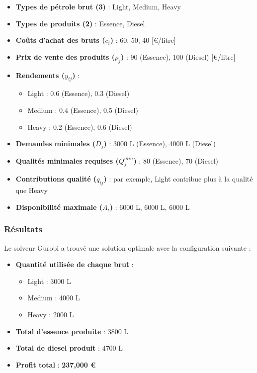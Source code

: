 \documentclass[a4paper,11pt]{article}
\begin{document}
\begin{itemize}
    \item \textbf{Types de pétrole brut (3)} : Light, Medium, Heavy
    \item \textbf{Types de produits (2)} : Essence, Diesel
    \item \textbf{Coûts d'achat des bruts ($c_i$)} : 60, 50, 40 [\euro /litre]
    \item \textbf{Prix de vente des produits ($p_j$)} : 90 (Essence), 100 (Diesel) [\euro /litre]
    \item \textbf{Rendements ($y_{ij}$)} :
    \begin{itemize}
        \item Light : 0.6 (Essence), 0.3 (Diesel)
        \item Medium : 0.4 (Essence), 0.5 (Diesel)
        \item Heavy : 0.2 (Essence), 0.6 (Diesel)
    \end{itemize}
    \item \textbf{Demandes minimales ($D_j$)} : 3000 L (Essence), 4000 L (Diesel)
    \item \textbf{Qualités minimales requises ($Q_j^{min}$)} : 80 (Essence), 70 (Diesel)
    \item \textbf{Contributions qualité ($q_{ij}$)} : par exemple, Light contribue plus à la qualité que Heavy
    \item \textbf{Disponibilité maximale ($A_i$)} : 6000 L, 6000 L, 6000 L
\end{itemize}

\subsubsection*{Résultats}

Le solveur Gurobi a trouvé une solution optimale avec la configuration suivante :

\begin{itemize}
    \item \textbf{Quantité utilisée de chaque brut} :
    \begin{itemize}
        \item Light : 3000 L
        \item Medium : 4000 L
        \item Heavy : 2000 L
    \end{itemize}
    \item \textbf{Total d’essence produite} : 3800 L
    \item \textbf{Total de diesel produit} : 4700 L
    \item \textbf{Profit total} : \textbf{237,000 \euro}
\end{itemize}
\end{document}
